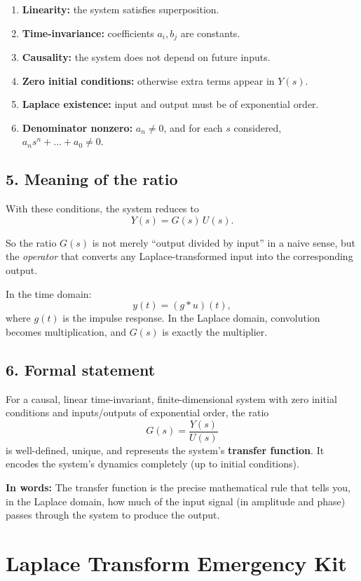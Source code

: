 \documentclass[12pt,a4paper]{article}
\begin{document}
	\begin{enumerate}
		\item \textbf{Linearity:} the system satisfies superposition.
		\item \textbf{Time-invariance:} coefficients $a_i, b_j$ are constants.
		\item \textbf{Causality:} the system does not depend on future inputs.
		\item \textbf{Zero initial conditions:} otherwise extra terms appear in $Y(s)$.
		\item \textbf{Laplace existence:} input and output must be of exponential order.
		\item \textbf{Denominator nonzero:} $a_n \neq 0$, and for each $s$ considered, $a_n s^n + \dots + a_0 \neq 0$.
	\end{enumerate}
	
	\subsection*{5. Meaning of the ratio}
	With these conditions, the system reduces to
	$$
	Y(s) = G(s)\, U(s).
	$$
	
	So the ratio $G(s)$ is not merely ``output divided by input'' in a naive sense, but the \emph{operator} that converts any Laplace-transformed input into the corresponding output.
	
	\medskip
	
	In the time domain:
	$$
	y(t) = (g * u)(t),
	$$
	where $g(t)$ is the impulse response.  
	In the Laplace domain, convolution becomes multiplication, and $G(s)$ is exactly the multiplier.
	
	\subsection*{6. Formal statement}
	For a causal, linear time-invariant, finite-dimensional system with zero initial conditions and inputs/outputs of exponential order, the ratio
	$$
	G(s) = \frac{Y(s)}{U(s)}
	$$
	is well-defined, unique, and represents the system’s \textbf{transfer function}. It encodes the system’s dynamics completely (up to initial conditions).
	
	\bigskip
	
	\textbf{In words:} The transfer function is the precise mathematical rule that tells you, in the Laplace domain, how much of the input signal (in amplitude and phase) passes through the system to produce the output.
	
	\section*{Laplace Transform Emergency Kit}
	
\end{document}
